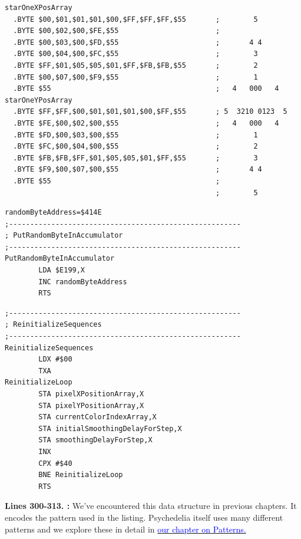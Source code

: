 \clearpage
\begin{lstlisting}[caption = Hopefully this looks familiar.]
starOneXPosArray
  .BYTE $00,$01,$01,$01,$00,$FF,$FF,$FF,$55       ;        5       
  .BYTE $00,$02,$00,$FE,$55                       ;                
  .BYTE $00,$03,$00,$FD,$55                       ;       4 4      
  .BYTE $00,$04,$00,$FC,$55                       ;        3       
  .BYTE $FF,$01,$05,$05,$01,$FF,$FB,$FB,$55       ;        2       
  .BYTE $00,$07,$00,$F9,$55                       ;        1       
  .BYTE $55                                       ;   4   000   4  
starOneYPosArray
  .BYTE $FF,$FF,$00,$01,$01,$01,$00,$FF,$55       ; 5  3210 0123  5
  .BYTE $FE,$00,$02,$00,$55                       ;   4   000   4  
  .BYTE $FD,$00,$03,$00,$55                       ;        1       
  .BYTE $FC,$00,$04,$00,$55                       ;        2       
  .BYTE $FB,$FB,$FF,$01,$05,$05,$01,$FF,$55       ;        3       
  .BYTE $F9,$00,$07,$00,$55                       ;       4 4      
  .BYTE $55                                       ;                
                                                  ;        5       
\end{lstlisting}

\bigskip
\begin{lstlisting}[caption= Random\, unused\, feels like a metaphor.]
randomByteAddress=$414E
;-------------------------------------------------------
; PutRandomByteInAccumulator
;-------------------------------------------------------
PutRandomByteInAccumulator   
        LDA $E199,X
        INC randomByteAddress
        RTS 
\end{lstlisting}
\bigskip
\begin{lstlisting}[caption = Fill our pixel arrays with zeros.]
;-------------------------------------------------------
; ReinitializeSequences
;-------------------------------------------------------
ReinitializeSequences   
        LDX #$00
        TXA 
ReinitializeLoop   
        STA pixelXPositionArray,X
        STA pixelYPositionArray,X
        STA currentColorIndexArray,X
        STA initialSmoothingDelayForStep,X
        STA smoothingDelayForStep,X
        INX 
        CPX #$40
        BNE ReinitializeLoop
        RTS 

\end{lstlisting}
\clearpage

\textbf{Lines 300-313. :} We've encountered this data structure in previous chapters. It encodes the pattern used in the listing.
Psychedelia itself uses many different patterns and we explore these in detail in
\hyperref[sec:patterns]{\textcolor{blue}{our chapter on Patterns.}} 

